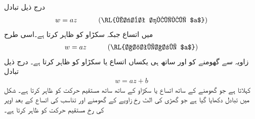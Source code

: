 درج ذیل تبادل
\begin{align*}
w=az \quad \quad \quad (\text{\RL{مثبت حقیقی $a$}})
\end{align*}
میں  اتساع جبکہ  سکڑاو کو ظاہر کرتا ہے۔اسی طرح 
\begin{align}
w=az\quad \quad \quad (\text{\RL{اختیاری $a$}})
\end{align}
زاویہ  سے گھومنے کو اور ساتھ ہی یکساں اتساع یا سکڑاو کو ظاہر کرتا ہے۔ درج ذیل تبادل
\begin{align}
w=az+b
\end{align}
 کہلاتا ہے جو گھومنے کے ساتھ اتساع یا سکڑاو  کے ساتھ ساتھ مستقیم حرکت  کو ظاہر کرتا ہے۔ شکل  میں  تبادل دکھایا گیا ہے جو گھڑی کی الٹ رخ   زاویے کے گھومنے اور  تناسب کی اتساع کے بعد اوپر کی رخ مستقیم حرکت کو ظاہر کرتا ہے۔  
